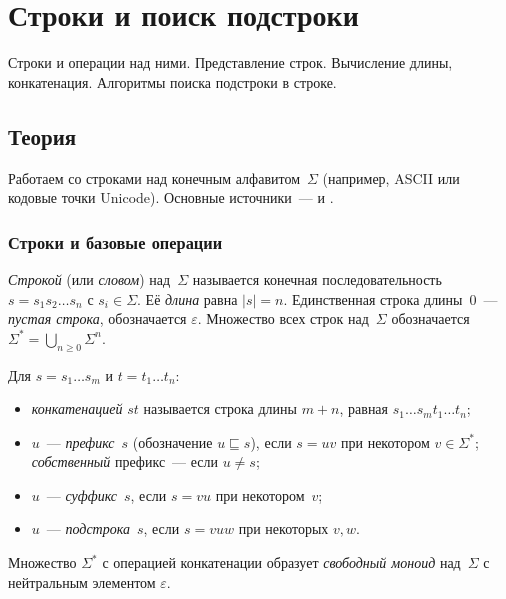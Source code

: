
\section{Строки и поиск подстроки}
\label{sec:1.3.02-strings-substring-search}

\begin{ticket}
Строки и операции над ними. Представление строк. Вычисление длины, конкатенация. Алгоритмы поиска подстроки в строке.
\end{ticket}

\subsection*{Теория}

Работаем со строками над конечным алфавитом~$\Sigma$ (например,
ASCII или кодовые точки Unicode). Основные источники~---
\cite[гл.~32]{CLRS2013} и \cite{Skiena2014}.

\subsubsection*{Строки и базовые операции}

\begin{definition}[Строка]
\label{def:string}
\emph{Строкой} (или \emph{словом}) над~$\Sigma$ называется конечная
последовательность $s = s_1 s_2 \dots s_n$ с $s_i \in \Sigma$. Её
\emph{длина} равна $|s| = n$. Единственная строка длины~$0$~---
\emph{пустая строка}, обозначается $\varepsilon$. Множество всех строк
над~$\Sigma$ обозначается $\Sigma^* = \bigcup_{n \geq 0} \Sigma^n$.
\end{definition}

\begin{definition}
\label{def:string-ops}
Для $s = s_1 \dots s_m$ и $t = t_1 \dots t_n$:
\begin{itemize}
  \item \emph{конкатенацией} $s t$ называется строка длины $m + n$,
        равная $s_1 \dots s_m t_1 \dots t_n$;
  \item $u$~--- \emph{префикс}~$s$ (обозначение $u \sqsubseteq s$),
        если $s = u v$ при некотором $v \in \Sigma^*$;
        \emph{собственный} префикс~--- если $u \neq s$;
  \item $u$~--- \emph{суффикс}~$s$, если $s = v u$ при некотором~$v$;
  \item $u$~--- \emph{подстрока}~$s$, если $s = v u w$ при некоторых
        $v, w$.
\end{itemize}
Множество $\Sigma^*$ с операцией конкатенации образует \emph{свободный
моноид} над~$\Sigma$ с нейтральным элементом $\varepsilon$.
\end{definition}

